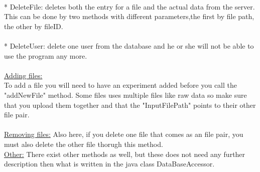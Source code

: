 \documentclass[a4paper]{report}
\begin{document}
\\
* DeleteFile: deletes both the entry for a file and the actual data from the server. This can be done by two methods with different parameters,the first by file path, the other by fileID.\\
\\
* DeleteUser: delete one user from the database and he or she will not be able to use the program any more.\\
\\
\underline{Adding files:}\\
To add a file you will need to have an experiment added before you call the "addNewFile" method. Some files uses multiple files like raw data so make sure that you upload them together and that the "InputFilePath" points to their other file pair.\\
\\
\underline{Removing files:} Also here, if you delete one file that comes as an file pair, you must also delete the other file thorugh this method.\\

\underline{Other:} There exist other methods as well, but these does not need any further description then what is written in the java class DataBaseAccessor.\\
\end{document}
